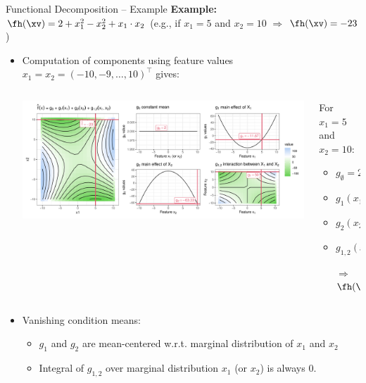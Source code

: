 \documentclass[11pt,compress,t,notes=noshow, aspectratio=169, xcolor=table]{beamer}
\newcommand{\open}{}
\newcommand{\close}{}
\begin{document}
\begin{frame}{Functional Decomposition -- Example}
\textbf{Example:} $\fh(\xv) = 2 + x_1^2 - x_2^2 + x_1 \cdot x_2$ (e.g., if $x_1 = 5$ and $x_2 = 10$ $\Rightarrow$ $\fh(\xv) = -23$)

\begin{itemize}
    \item Computation of components using feature values $x_1 = x_2 = (-10, -9, \ldots, 10)^\top$ gives:
    \begin{columns}[c, totalwidth=\linewidth]
    \begin{column}{0.75\textwidth}
        \includegraphics[width = \textwidth]{figure/decomposition}
    \end{column}
    \begin{column}{0.25\textwidth}
    For $x_1 = 5$ and $x_2 = 10$:\\
    \begin{itemize}
        \item $g_{\open \emptyset \close} = 2$
        \item $g_{\open 1 \close}(x_1) = -9.67$
        \item $g_{\open 2 \close}(x_2) = -65.33$
        \item $g_{\open 1,2 \close}(x_1, x_2) = 50$
        \item[$\Rightarrow$] $\fh(\xv) = -23$
    \end{itemize}
    \end{column}
    \end{columns}
\pause
    \item Vanishing condition means:
    \begin{itemize}
        \item $g_1$ and $g_2$ are mean-centered w.r.t. marginal distribution of $x_1$ and $x_2$
        \item Integral of $g_{1,2}$ over marginal distribution $x_1$ (or $x_2$) is always 0.
    \end{itemize}
\end{itemize} 
\end{frame}
\end{document}
